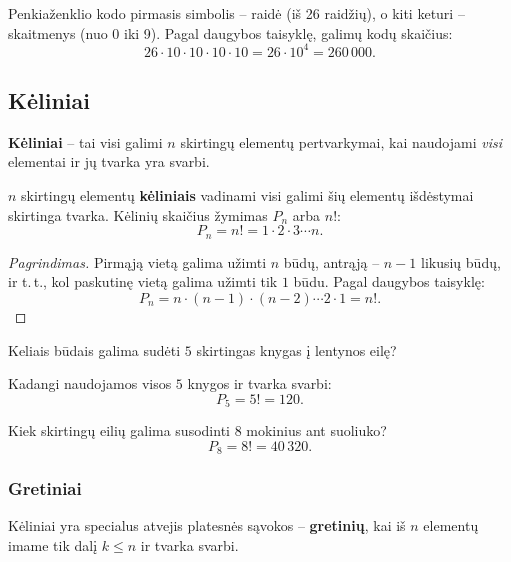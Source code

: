 \begin{example}
Penkiaženklio kodo pirmasis simbolis -- raidė (iš 26 raidžių), o kiti keturi -- skaitmenys (nuo 0 iki 9). Pagal daugybos taisyklę, galimų kodų skaičius:
\[
26 \cdot 10 \cdot 10 \cdot 10 \cdot 10 = 26 \cdot 10^4 = 260\,000.
\]
\end{example}

\subsection{Kėliniai}

\textbf{Kėliniai} -- tai visi galimi $n$ skirtingų elementų pertvarkymai, kai naudojami \emph{visi} elementai ir jų tvarka yra svarbi.

\begin{definition}[Kėliniai]
$n$ skirtingų elementų \textbf{kėliniais} vadinami visi galimi šių elementų išdėstymai skirtinga tvarka. Kėlinių skaičius žymimas $P_n$ arba $n!$:
\[
P_n = n! = 1 \cdot 2 \cdot 3 \cdots n.
\]
\end{definition}

\begin{proof}[Pagrindimas]
Pirmąją vietą galima užimti $n$ būdų, antrąją -- $n-1$ likusių būdų, ir t.\,t., kol paskutinę vietą galima užimti tik $1$ būdu. Pagal daugybos taisyklę:
\[
P_n = n \cdot (n-1) \cdot (n-2) \cdots 2 \cdot 1 = n!.
\]
\end{proof}

\begin{example}
Keliais būdais galima sudėti $5$ skirtingas knygas į lentynos eilę?

Kadangi naudojamos visos $5$ knygos ir tvarka svarbi:
\[
P_5 = 5! = 120.
\]
\end{example}

\begin{example}
Kiek skirtingų eilių galima susodinti $8$ mokinius ant suoliuko?
\[
P_8 = 8! = 40\,320.
\]
\end{example}

\subsubsection*{Gretiniai}

Kėliniai yra specialus atvejis platesnės sąvokos -- \textbf{gretinių}, kai iš $n$ elementų imame tik dalį $k \leq n$ ir tvarka svarbi.

